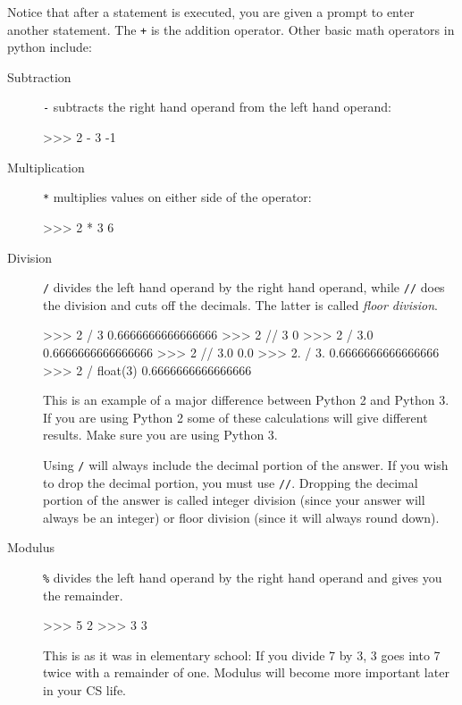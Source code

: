\documentclass[11pt]{cselabheader}
\begin{document}
Notice that after a statement is executed, you are given a prompt to enter
another statement. The \texttt{+} is the addition operator. Other basic math
operators in python include:

\begin{description}
  \item[Subtraction] \texttt{-} subtracts the right hand operand from the left
    hand operand:

    \begin{python3code}
>>> 2 - 3
-1
    \end{python3code}

  \item[Multiplication] \texttt{*} multiplies values on either side of the
    operator:

    \begin{python3code}
>>> 2 * 3
6
    \end{python3code}

  \item[Division] \texttt{/} divides the left hand operand by the right hand
    operand, while \texttt{//} does the division and cuts off the decimals. The
    latter is called \emph{floor division}.

  \begin{python3code}
>>> 2 / 3
0.6666666666666666
>>> 2 // 3
0
>>> 2 / 3.0
0.6666666666666666
>>> 2 // 3.0
0.0
>>> 2. / 3.
0.6666666666666666
>>> 2 / float(3)
0.6666666666666666
  \end{python3code}

    This is an example of a major difference between Python 2 and Python 3. If
    you are using Python 2 some of these calculations will give different
    results. Make sure you are using Python 3.

    Using \texttt{/} will always include the decimal portion of the answer. If
    you wish to drop the decimal portion, you must use \texttt{//}. Dropping the
    decimal portion of the answer is called integer division (since your answer
    will always be an integer) or floor division (since it will always round
    down).

  \item[Modulus] \texttt{\%} divides the left hand operand by the right hand
    operand and gives you the remainder.

    \begin{python3code}
>>> 5 %
2
>>> 3 %
3
    \end{python3code}

    This is as it was in elementary school: If you divide 7 by 3, 3 goes into 7
    twice with a remainder of one. Modulus will become more important later in
    your CS life.


\end{description}
\end{document}
